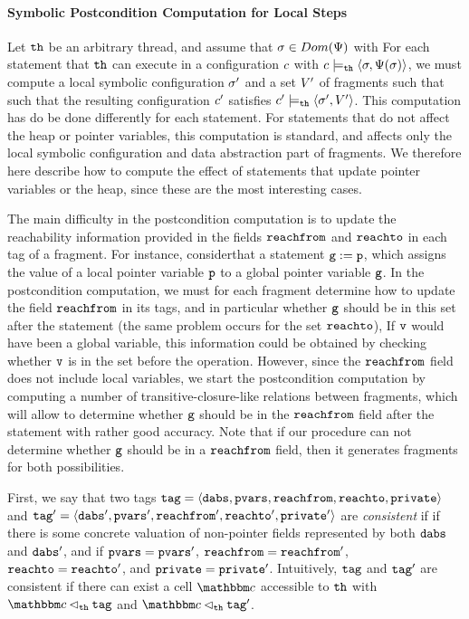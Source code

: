 \paragraph{Symbolic Postcondition Computation for Local Steps}
Let ${\tt th}$ be an arbitrary thread, and assume 
that $\sigma \in Dom(\Psi)$ with
For each statement that ${\tt th}$ can execute in a configuration $c$
with $c \models_{{\tt th}} \left\langle\sigma,\Psi(\sigma)\right\rangle$,
we must compute a local symbolic configuration $\sigma'$ and
a set  $V'$ of fragments such that
such that the resulting configuration $c'$ satisfies
  $c' \models_{{\tt th}} \left\langle\sigma',V'\right\rangle$.
This computation has do be done differently for
each statement. For statements that do not affect the heap or pointer variables,
this computation is standard, and affects only the local symbolic
configuration and data abstraction part of fragments.
We therefore here describe how to compute the effect of statements that update
pointer variables or the heap, since these are the most interesting cases.


The main difficulty in the
postcondition computation is to update the reachability information provided
in the fields $\mathtt{reachfrom}$ and $\mathtt{reachto}$ in each tag of a 
fragment. For instance, considerthat a statement $\mathtt{g} := \mathtt{p}$,
which assigns the value of a local pointer variable $\mathtt{p}$ to a global
pointer variable $\mathtt{g}$.
In the postcondition computation, we must for each fragment
determine how to update the field $\mathtt{reachfrom}$ in its tags, and in particular
whether $\mathtt{g}$ should be in this set after the statement
(the same problem occurs for the set $\mathtt{reachto}$),
If $\mathtt{v}$ would have been a global variable, this information could
be obtained by checking whether $\mathtt{v}$ is in the set before the operation.
However, since the $\mathtt{reachfrom}$ field does not include local variables, we
start the postcondition computation by computing a number of
transitive-closure-like relations between fragments, which will allow
to determine whether $\mathtt{g}$ should be in the $\mathtt{reachfrom}$ field after
the statement with rather good accuracy. Note that if our procedure can not
determine whether $\mathtt{g}$ should be in  a $\mathtt{reachfrom}$ field, then it
generates fragments for both possibilities.

First, we say that two tags
$\mathtt{tag} = \left\langle\mathtt{dabs},\mathtt{pvars},\mathtt{reachfrom},\mathtt{reachto},\mathtt{private}\right\rangle$ and $\mathtt{tag}' = \left\langle\mathtt{dabs}',\mathtt{pvars}',\mathtt{reachfrom}',\mathtt{reachto}',\mathtt{private}'\right\rangle$ are {\em consistent} if
if there is some concrete valuation of non-pointer fields represented by both
$\mathtt{dabs}$ and $\mathtt{dabs}'$, and if
$\mathtt{pvars} = \mathtt{pvars}'$, $\mathtt{reachfrom} = \mathtt{reachfrom}'$, $\mathtt{reachto} = \mathtt{reachto}'$, and
$\mathtt{private} = \mathtt{private}'$.
Intuitively, $\mathtt{tag}$ and $\mathtt{tag}'$ are consistent if there can exist a cell
$\cell$ accessible to ${\tt th}$ with $\cell \satfrag{\thread} \atag$
and $\cell \satfrag{\thread} \atag'$.

